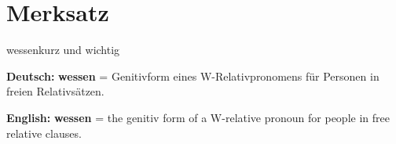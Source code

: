 \documentclass[a4paper,11pt]{article}
\newcommand{\GermanText}[1]{\textbf{Deutsch: }#1\par}
\newcommand{\EnglishText}[1]{{\small\color{SoftGray}\textbf{English: }#1\par}}
\begin{document}
\section{Merksatz}

\begin{grammarentry}{wessen}{kurz und wichtig}

\GermanText{\textbf{wessen} = Genitivform eines W-Relativpronomens für Personen in freien Relativsätzen.}

\EnglishText{\textbf{wessen} = the genitiv form of a W-relative pronoun for people in free relative clauses.}

\end{grammarentry}
\end{document}
